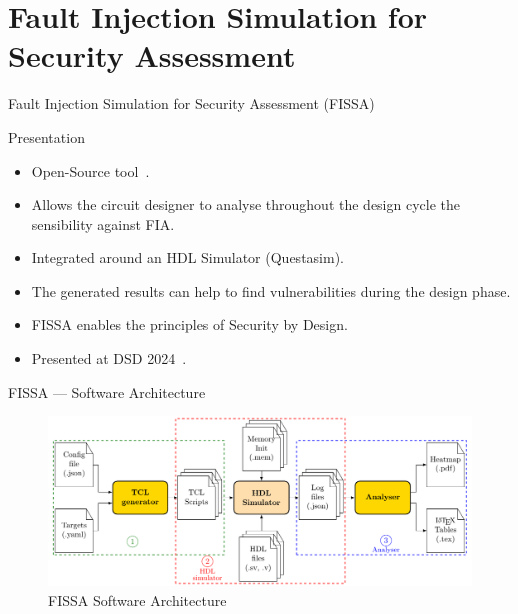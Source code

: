 \section{Fault Injection Simulation for Security Assessment}

\begin{frame}{Fault Injection Simulation for Security Assessment (FISSA)}
    \begin{block}{Presentation}
        \begin{itemize}
            \item Open-Source tool~\cite{fissa}.
            \item Allows the circuit designer to analyse throughout the design cycle the sensibility against FIA.
            \item Integrated around an HDL Simulator (Questasim).
            \item The generated results can help to find vulnerabilities during the design phase.
            \item FISSA enables the principles of Security by Design.
            \item Presented at DSD 2024~\cite{PLG-24-dsd}.
        \end{itemize}
    \end{block}
\end{frame}

\begin{frame}{FISSA — Software Architecture}
    \begin{figure}
        \centering
        \includegraphics[width=.9\textwidth, page=2]{src/3_fissa/img/fissa/archi_fissa.pdf}
        \caption{FISSA Software Architecture}
        \label{fig:archiSoft}
    \end{figure}
\end{frame}

